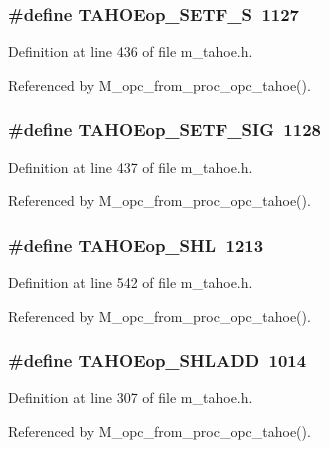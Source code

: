 \subsubsection{\setlength{\rightskip}{0pt plus 5cm}\#define TAHOEop\_\-SETF\_\-S~1127}\label{m__tahoe_8h_42267820dab4f7dabdab215cf9e42d67}




Definition at line 436 of file m\_\-tahoe.h.

Referenced by M\_\-opc\_\-from\_\-proc\_\-opc\_\-tahoe().
\subsubsection{\setlength{\rightskip}{0pt plus 5cm}\#define TAHOEop\_\-SETF\_\-SIG~1128}\label{m__tahoe_8h_bbc5980dd329021de48716d27f28cd8a}




Definition at line 437 of file m\_\-tahoe.h.

Referenced by M\_\-opc\_\-from\_\-proc\_\-opc\_\-tahoe().
\subsubsection{\setlength{\rightskip}{0pt plus 5cm}\#define TAHOEop\_\-SHL~1213}\label{m__tahoe_8h_deec07792a9b6ca6d283925cff626a18}




Definition at line 542 of file m\_\-tahoe.h.

Referenced by M\_\-opc\_\-from\_\-proc\_\-opc\_\-tahoe().
\subsubsection{\setlength{\rightskip}{0pt plus 5cm}\#define TAHOEop\_\-SHLADD~1014}\label{m__tahoe_8h_35a4c00d2ac2ad870e046bb2315dcfe4}




Definition at line 307 of file m\_\-tahoe.h.

Referenced by M\_\-opc\_\-from\_\-proc\_\-opc\_\-tahoe().
